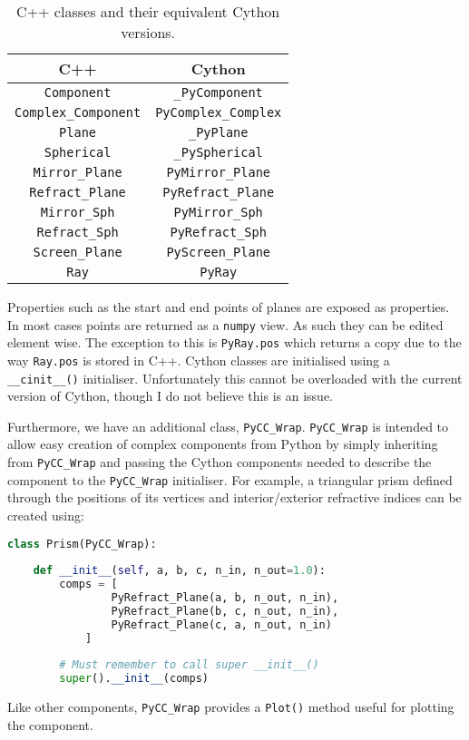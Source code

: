 \documentclass{article}
\begin{document}
\begin{table}[h!]
\centering
    \begin{tabular}{ |c|c| } 
         \hline
         C++ & Cython \\ 
         \hline
         \texttt{Component} & \texttt{\_PyComponent} \\ 
         \texttt{Complex\_Component} & \texttt{PyComplex\_Complex} \\ 
         \texttt{Plane} & \texttt{\_PyPlane} \\ 
         \texttt{Spherical} & \texttt{\_PySpherical} \\ 
         \texttt{Mirror\_Plane} & \texttt{PyMirror\_Plane} \\ 
         \texttt{Refract\_Plane} & \texttt{PyRefract\_Plane} \\ 
         \texttt{Mirror\_Sph} & \texttt{PyMirror\_Sph} \\ 
         \texttt{Refract\_Sph} & \texttt{PyRefract\_Sph} \\ 
         \texttt{Screen\_Plane} & \texttt{PyScreen\_Plane} \\
         \texttt{Ray} & \texttt{PyRay} \\ 
         \hline
         
    \end{tabular}
    \caption{C++ classes and their equivalent Cython versions.}
    \label{tab:C++ to Cython mappings}
\end{table}

Properties such as the start and end points of planes are exposed as properties. In most cases points are returned as a \texttt{numpy} view. As such they can be edited element wise. The exception to this is \texttt{PyRay.pos} which returns a copy due to the way \texttt{Ray.pos} is stored in C++. Cython classes are initialised using a \texttt{\_\_cinit\_\_()} initialiser. Unfortunately this cannot be overloaded with the current version of Cython, though I do not believe this is an issue.

Furthermore, we have an additional class, \texttt{PyCC\_Wrap}. \texttt{PyCC\_Wrap} is intended to allow easy creation of complex components from Python by simply inheriting from \texttt{PyCC\_Wrap} and passing the Cython components needed to describe the component to the \texttt{PyCC\_Wrap} initialiser. For example, a triangular prism defined through the positions of its vertices and interior/exterior refractive indices can be created using:
\begin{lstlisting}[language=Python]
class Prism(PyCC_Wrap):
    
    def __init__(self, a, b, c, n_in, n_out=1.0):
        comps = [
                PyRefract_Plane(a, b, n_out, n_in),
                PyRefract_Plane(b, c, n_out, n_in),
                PyRefract_Plane(c, a, n_out, n_in)
            ]
            
        # Must remember to call super __init__()
        super().__init__(comps)  
\end{lstlisting}
Like other components, \texttt{PyCC\_Wrap} provides a \texttt{Plot()} method useful for plotting the component.



\end{document}
